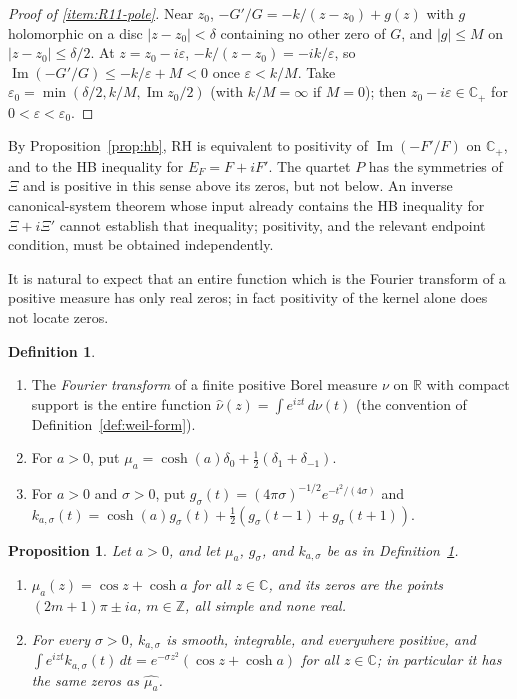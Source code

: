 \documentclass[11pt]{amsart}
\theoremstyle{plain}
\newtheorem{proposition}[theorem]{Proposition}
\theoremstyle{definition}
\newtheorem{definition}[theorem]{Definition}
\theoremstyle{remark}
\numberwithin{equation}{section}
\newcommand{\C}{\mathbb{C}}
\newcommand{\R}{\mathbb{R}}
\newcommand{\Z}{\mathbb{Z}}
\newcommand{\Cp}{\mathbb{C}_{+}}
\DeclareMathOperator{\Ima}{Im}
\renewcommand{\Im}{\Ima}
\begin{document}
\begin{proof}[Proof of \ref{item:R11-pole}]
Near $z_0$, $-G'/G=-k/(z-z_0)+g(z)$ with $g$ holomorphic on a disc
$|z-z_0|<\delta$ containing no other zero of $G$, and $|g|\le M$ on
$|z-z_0|\le\delta/2$. At $z=z_0-i\varepsilon$,
$-k/(z-z_0)=-ik/\varepsilon$, so
$\Im(-G'/G)\le-k/\varepsilon+M<0$ once $\varepsilon<k/M$. Take
$\varepsilon_0=\min(\delta/2,k/M,\Im z_0/2)$ (with $k/M=\infty$ if
$M=0$); then $z_0-i\varepsilon\in\Cp$ for $0<\varepsilon<\varepsilon_0$.
\end{proof}

By Proposition~\ref{prop:hb}, RH is equivalent to positivity of
$\Im(-F'/F)$ on $\Cp$, and to the HB inequality for $E_F=F+iF'$. The
quartet $P$ has the symmetries of $\Xi$ and is positive in this sense
above its zeros, but not below. An inverse canonical-system theorem whose
input already contains the HB inequality for $\Xi+i\Xi'$ cannot establish
that inequality; positivity, and the relevant endpoint condition, must
be obtained independently.

It is natural to expect that an entire function which is the Fourier
transform of a positive measure has only real zeros; in fact positivity
of the kernel alone does not locate zeros.

\begin{definition}\label{def:R12-kernels}
\begin{enumerate}[label=(\alph*)]
\item The \emph{Fourier transform} of a finite positive Borel measure
  $\nu$ on $\R$ with compact support is the entire function
  $\widehat\nu(z)=\int e^{izt}\,d\nu(t)$ (the convention of
  Definition~\ref{def:weil-form}).
\item For $a>0$, put
  $\mu_a=\cosh(a)\delta_0+\tfrac12(\delta_1+\delta_{-1})$.
\item For $a>0$ and $\sigma>0$, put
  $g_\sigma(t)=(4\pi\sigma)^{-1/2}e^{-t^2/(4\sigma)}$ and
  $k_{a,\sigma}(t)=\cosh(a)g_\sigma(t)
  +\tfrac12(g_\sigma(t-1)+g_\sigma(t+1))$.
\end{enumerate}
\end{definition}

\begin{proposition}\label{prop:R12}
Let $a>0$, and let $\mu_a$, $g_\sigma$, and $k_{a,\sigma}$ be as in
Definition~\ref{def:R12-kernels}.
\begin{enumerate}[label=(\roman*)]
\item\label{item:R12-atoms} $\widehat{\mu_a}(z)=\cos z+\cosh a$ for all
  $z\in\C$, and its zeros are the points $(2m+1)\pi\pm ia$, $m\in\Z$, all
  simple and none real.
\item\label{item:R12-gauss} For every $\sigma>0$, $k_{a,\sigma}$ is
  smooth, integrable, and everywhere positive, and
  $\int e^{izt}k_{a,\sigma}(t)\,dt=e^{-\sigma z^2}(\cos z+\cosh a)$
  for all $z\in\C$; in particular it has the same zeros as
  $\widehat{\mu_a}$.
\end{enumerate}
\end{proposition}
\end{document}
